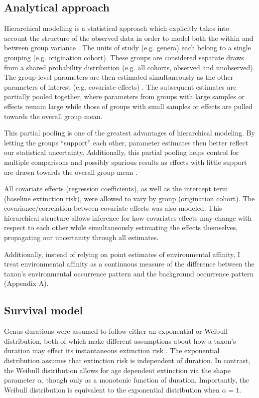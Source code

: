 \documentclass{article}
\begin{document}
\subsection{Analytical approach}

Hierarchical modelling is a statistical approach which explicitly takes into account the structure of the observed data in order to model both the within and between group variance \citep{Gelman2013d,Gelman2007}. The units of study (e.g. genera) each belong to a single grouping (e.g. origination cohort). These groups are considered separate draws from a shared probability distribution (e.g. all cohorts, observed and unobserved). The group-level parameters are then estimated simultaneously as the other parameters of interest (e.g. covariate effects) \citep{Gelman2013d}. The subsequent estimates are partially pooled together, where parameters from groups with large samples or effects remain large while those of groups with small samples or effects are pulled towards the overall group mean. 

This partial pooling is one of the greatest advantages of hierarchical modeling. By letting the groups ``support'' each other, parameter estimates then better reflect our statistical uncertainty. Additionally, this partial pooling helps control for multiple comparisons and possibly spurious results as effects with little support are drawn towards the overall group mean \citep{Gelman2013d,Gelman2007}. 

All covariate effects (regression coefficients), as well as the intercept term (baseline extinction risk), were allowed to vary by group (origination cohort). The covariance/correlation between covariate effects was also modeled. This hierarchical structure allows inference for how covariates effects may change with respect to each other while simultaneously estimating the effects themselves, propagating our uncertainty through all estimates. 

Additionally, instead of relying on point estimates of environmental affinity, I treat environmental affinity as a continuous measure of the difference between the taxon's environmental occurrence pattern and the background occurrence pattern (Appendix A).

\subsection{Survival model}

Genus durations were assumed to follow either an exponential or Weibull distribution, both of which make different assumptions about how a taxon's duration may effect its instantaneous extinction risk \citep{Klein2003}. The exponential distribution assumes that extinction risk is independent of duration. In contrast, the Weibull distribution allows for age dependent extinction via the shape parameter \(\alpha\), though only as a monotonic function of duration. Importantly, the Weibull distribution is equivalent to the exponential distribution when \(\alpha = 1\). 
\end{document}
